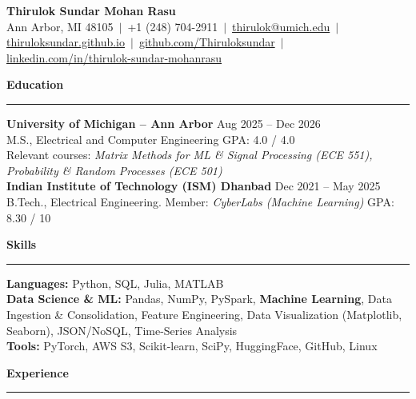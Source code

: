 \documentclass[8.2pt]{article}
\newcommand{\sect}[1]{\vspace{1pt}\noindent\textbf{\large #1}\vspace{1pt}\hrule\vspace{3pt}}
\begin{document}
\begin{center}
  {\Large \textbf{Thirulok Sundar Mohan Rasu}}\\[4pt]
  Ann Arbor, MI 48105 $\,|\,$ +1 (248) 704-2911 $\,|\,$
  \href{mailto:thirulok@umich.edu}{thirulok@umich.edu} $\,|\,$
  \href{https://thiruloksundar.github.io}{thiruloksundar.github.io} $\,|\,$
  \href{https://github.com/Thiruloksundar}{github.com/Thiruloksundar} $\,|\,$
  \href{https://www.linkedin.com/in/thirulok-sundar-mohanrasu/}{linkedin.com/in/thirulok-sundar-mohanrasu}
\end{center}
\vspace{-3mm}

\sect{Education}
\vspace{-2mm}
\textbf{University of Michigan -- Ann Arbor} \hfill Aug 2025 -- Dec 2026\\
M.S., Electrical and Computer Engineering \hfill GPA: 4.0 / 4.0\\
Relevant courses: \emph{Matrix Methods for ML \& Signal Processing (ECE 551), Probability \& Random Processes (ECE 501)}\\[4pt]
\textbf{Indian Institute of Technology (ISM) Dhanbad} \hfill Dec 2021 -- May 2025\\
B.Tech., Electrical Engineering. Member: \emph{CyberLabs (Machine Learning)} \hfill GPA: 8.30 / 10

\sect{Skills}
\vspace{-2mm}
\textbf{Languages:} Python, SQL, Julia, MATLAB\\
\textbf{Data Science \& ML:} Pandas, NumPy, PySpark, \textbf{Machine Learning}, Data Ingestion \& Consolidation, Feature Engineering, Data Visualization (Matplotlib, Seaborn), JSON/NoSQL, Time-Series Analysis\\
\textbf{Tools:} PyTorch, AWS S3, Scikit-learn, SciPy, HuggingFace, GitHub, Linux

\sect{Experience}
\vspace{-2mm}
\end{document}
